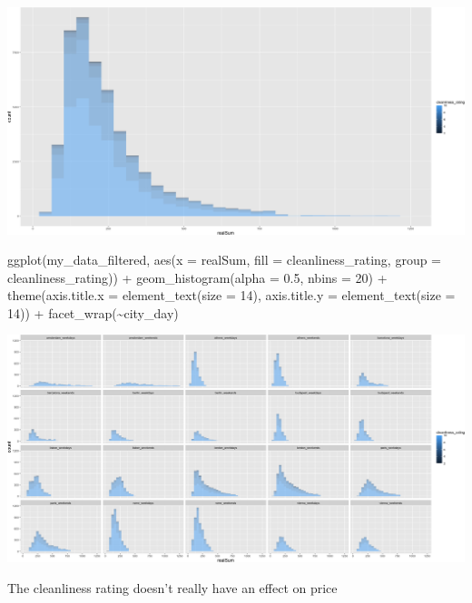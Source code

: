 \documentclass[
]{article}
\newenvironment{Shaded}{\begin{snugshade}}{\end{snugshade}}
\newcommand{\AttributeTok}[1]{\textcolor[rgb]{0.77,0.63,0.00}{#1}}
\newcommand{\DecValTok}[1]{\textcolor[rgb]{0.00,0.00,0.81}{#1}}
\newcommand{\FloatTok}[1]{\textcolor[rgb]{0.00,0.00,0.81}{#1}}
\newcommand{\FunctionTok}[1]{\textcolor[rgb]{0.00,0.00,0.00}{#1}}
\newcommand{\NormalTok}[1]{#1}
\newcommand{\SpecialCharTok}[1]{\textcolor[rgb]{0.00,0.00,0.00}{#1}}
\begin{document}
\includegraphics{Project_files/figure-latex/unnamed-chunk-23-2.png}

\begin{Shaded}
\begin{Highlighting}[]
\FunctionTok{ggplot}\NormalTok{(my\_data\_filtered, }\FunctionTok{aes}\NormalTok{(}\AttributeTok{x =}\NormalTok{ realSum, }\AttributeTok{fill =}\NormalTok{ cleanliness\_rating,}
    \AttributeTok{group =}\NormalTok{ cleanliness\_rating)) }\SpecialCharTok{+} \FunctionTok{geom\_histogram}\NormalTok{(}\AttributeTok{alpha =} \FloatTok{0.5}\NormalTok{,}
    \AttributeTok{nbins =} \DecValTok{20}\NormalTok{) }\SpecialCharTok{+} \FunctionTok{theme}\NormalTok{(}\AttributeTok{axis.title.x =} \FunctionTok{element\_text}\NormalTok{(}\AttributeTok{size =} \DecValTok{14}\NormalTok{),}
    \AttributeTok{axis.title.y =} \FunctionTok{element\_text}\NormalTok{(}\AttributeTok{size =} \DecValTok{14}\NormalTok{)) }\SpecialCharTok{+} \FunctionTok{facet\_wrap}\NormalTok{(}\SpecialCharTok{\textasciitilde{}}\NormalTok{city\_day)}
\end{Highlighting}
\end{Shaded}

\includegraphics{Project_files/figure-latex/unnamed-chunk-23-3.png}

The cleanliness rating doesn't really have an effect on price
\end{document}
